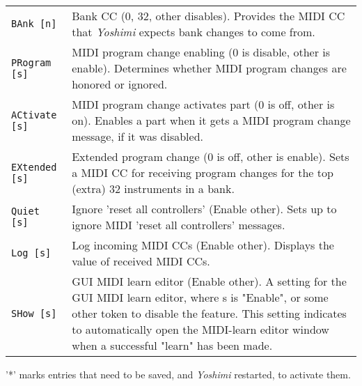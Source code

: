 \begin{center}
\begin{longtable}{p{4cm} p{10cm}}
\texttt{BAnk [n]} &
   Bank CC (0, 32, other disables).
   Provides the MIDI CC that \textsl{Yoshimi} expects
   bank changes to come from.  \\
\texttt{PRogram [s]} &
   MIDI program change enabling (0 is disable, other is enable).
   Determines whether MIDI program changes are honored or ignored.  \\
\texttt{ACtivate [s]} &
   MIDI program change activates part (0 is off, other is on).
   Enables a part when it gets a MIDI program change message,
   if it was disabled.  \\
\texttt{EXtended [s]} &
   Extended program change (0 is off, other is enable).
   Sets a MIDI CC for receiving program changes for the top (extra)
   32 instruments in a bank.  \\
\texttt{Quiet [s]} &
   Ignore 'reset all controllers' (Enable other).
   Sets up to ignore MIDI 'reset all controllers' messages. \\
\texttt{Log [s]} &
   Log incoming MIDI CCs (Enable other).
   Displays the value of received MIDI CCs. \\
\texttt{SHow [s]} &
   GUI MIDI learn editor (Enable other).
   A setting for the GUI MIDI learn editor, where s is "Enable", or some
   other token to disable the feature.
   This setting indicates to automatically open the MIDI-learn editor window
   when a successful "learn" has been made.  \\

\end{longtable}
\end{center}


   '*' marks entries that need to be saved, and \textsl{Yoshimi}
   restarted, to activate them.

